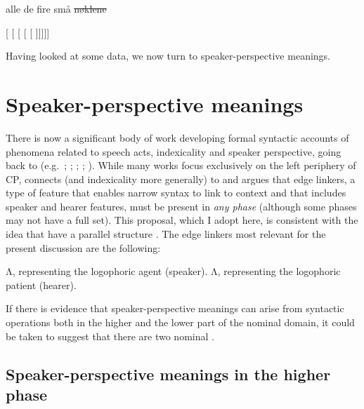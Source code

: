 \documentclass[output=paper]{langsci/langscibook}
\begin{document}
	\ex
	alle de fire små \sout{nøklene}

		[ [ [ [ [ ]]]]]

		\z

\z

\noindent Having looked at some  data, we now turn to
speaker-perspective meanings.

\section{Speaker-perspective meanings}

There is now a significant body of work developing formal syntactic accounts of
phenomena related to speech acts, indexicality and speaker perspective, going
back to  (e.g.\ \citealt{SpeaTenn2003};
\citealt{giorgi2010about}; \citealt{hill2013vocatives};
\citealt{sigurdsson2014context}; \citealt{wiltschkoheim2016confirmationals}).
While many works focus exclusively on the left periphery of  CP,
\citet[179]{sigurdsson2014context} connects  (and
indexicality more generally) to  and argues that edge linkers, a
type of feature that enables narrow syntax to link to context and that includes
speaker and hearer features, must be present in \emph{any phase} (although some
phases may not have a full set). This proposal, which I adopt here, is
consistent with the idea that  have a parallel structure
\citep{poletto2006parallel}. The edge linkers most relevant for the present
discussion are the following:

\ea
	\ea  Λ, representing the logophoric agent (speaker).
	\ex   Λ, representing the logophoric patient (hearer).
	\z
\z

\noindent If there is evidence that speaker-perspective meanings can arise from
syntactic operations both in  the higher and the lower part of the nominal
domain, it could be taken to suggest that there are two nominal .

\subsection{Speaker-perspective meanings in the higher phase}
\end{document}
